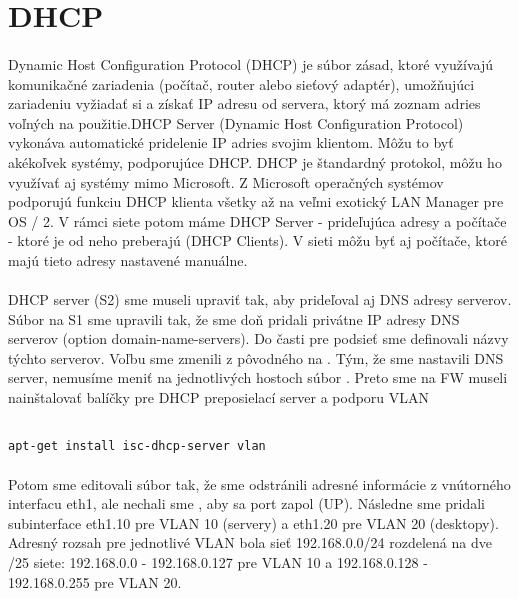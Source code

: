 \section{DHCP}
\paragraph{}
Dynamic Host Configuration Protocol (DHCP) je súbor zásad, ktoré využívajú komunikačné zariadenia (počítač, router alebo sieťový adaptér), umožňujúci zariadeniu vyžiadať si a získať IP adresu od servera, ktorý má zoznam adries voľných na použitie.DHCP Server (Dynamic Host Configuration Protocol) vykonáva automatické pridelenie IP adries svojim klientom. Môžu to byť akékoľvek systémy, podporujúce DHCP. DHCP je štandardný protokol, môžu ho využívať aj systémy mimo Microsoft. Z Microsoft operačných systémov podporujú funkciu DHCP klienta všetky až na veľmi exotický LAN Manager pre OS / 2. V rámci siete potom máme DHCP Server - prideľujúca adresy a počítače - ktoré je od neho preberajú (DHCP Clients). V sieti môžu byť aj počítače, ktoré majú tieto adresy nastavené manuálne.

\paragraph{}
DHCP server (S2) sme museli upraviť tak, aby prideľoval aj DNS adresy serverov. Súbor  na S1 sme upravili tak, že sme doň pridali privátne IP adresy DNS serverov (option domain-name-servers). Do časti pre podsieť sme definovali názvy týchto serverov. Voľbu  sme zmenili z pôvodného  na . Tým, že sme nastavili DNS server, nemusíme meniť na jednotlivých hostoch súbor .
Preto sme na FW museli nainštalovať balíčky pre DHCP preposielací server a podporu VLAN

\noindent
{\selectfont
\begin{small}
\begin{verbatim}

apt-get install isc-dhcp-server vlan

\end{verbatim}
\end{small}
}

\paragraph{}
Potom sme editovali súbor  tak, že sme odstránili adresné informácie z vnútorného interfacu eth1, ale nechali sme , aby sa port zapol (UP). Následne sme pridali subinterface eth1.10 pre VLAN 10 (servery) a eth1.20 pre VLAN 20 (desktopy). Adresný rozsah pre jednotlivé VLAN bola sieť 192.168.0.0/24 rozdelená na dve /25 siete: 192.168.0.0 - 192.168.0.127 pre VLAN 10 a 192.168.0.128 - 192.168.0.255 pre VLAN 20.

